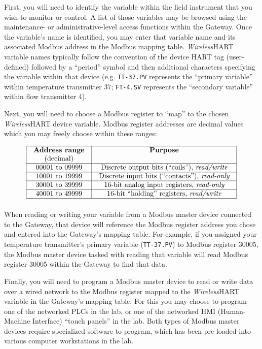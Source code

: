 \vskip 10pt

First, you will need to identify the variable within the field instrument that you wish to monitor or control.  A list of those variables may be browsed using the maintenance- or administrative-level access functions within the Gateway.  Once the variable's name is identified, you may enter that variable name and its associated Modbus address in the Modbus mapping table.  {\sl Wireless}HART variable names typically follow the convention of the device HART tag (user-defined) followed by a ``period'' symbol and then additional characters specifying the variable within that device (e.g. {\tt TT-37.PV} represents the ``primary variable'' within temperature transmitter 37; {\tt FT-4.SV} represents the ``secondary variable'' within flow transmitter 4).

\vskip 10pt

Next, you will need to choose a Modbus register to ``map'' to the chosen {\sl Wireless}HART device variable.  Modbus register addresses are decimal values which you may freely choose within these ranges:
 

$$\vbox{\offinterlineskip
\halign{\strut
\vrule \quad\hfil # \ \hfil & 
\vrule \quad\hfil # \ \hfil \vrule \cr
\noalign{\hrule}
%
{\bf Address range} & {\bf Purpose} \cr
(decimal) & \cr
%
\noalign{\hrule}
%
00001 to 09999 & Discrete output bits (``coils''), {\it read/write} \cr
%
\noalign{\hrule}
%
10001 to 19999 & Discrete input bits (``contacts''), {\it read-only} \cr
%
\noalign{\hrule}
%
30001 to 39999 & 16-bit analog input registers, {\it read-only} \cr
%
\noalign{\hrule}
%
40001 to 49999 & 16-bit ``holding'' registers, {\it read/write} \cr
%
\noalign{\hrule}
} %
}$$ %

When reading or writing your variable from a Modbus master device connected to the Gateway, that device will reference the Modbus register address you chose and entered into the Gateway's mapping table.  For example, if you assigned your temperature transmitter's primary variable ({\tt TT-37.PV}) to Modbus register 30005, the Modbus master device tasked with reading that variable will read Modbus register 30005 within the Gateway to find that data.

\vskip 10pt

Finally, you will need to program a Modbus master device to read or write data over a wired network to the Modbus register mapped to the {\sl Wireless}HART variable in the Gateway's mapping table.  For this you may choose to program one of the networked PLCs in the lab, or one of the networked HMI (Human-Machine Interface) ``touch panels'' in the lab.  Both types of Modbus master devices require specialized software to program, which has been pre-loaded into various computer workstations in the lab.

